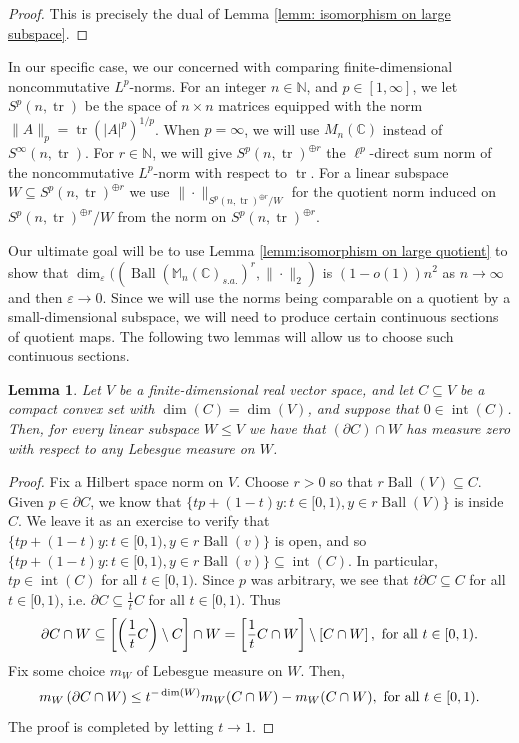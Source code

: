 \documentclass[10pt]{amsart}
\newtheorem{lem}[thm]{Lemma}
\theoremstyle{definition}
\numberwithin{equation}{section}
\newcommand{\bC}{{\mathbb C}}
\newcommand{\bM}{{\mathbb M}}
\newcommand{\bN}{{\mathbb N}}
\DeclareMathOperator{\tr}{tr}
\DeclareMathOperator{\Int}{int}
\DeclareMathOperator{\Ball}{Ball}
\begin{document}
\begin{proof}
This is precisely the dual of Lemma \ref{lemm: isomorphism on large subspace}.
\end{proof}

In our specific case, we our concerned with comparing finite-dimensional noncommutative $L^{p}$-norms. For an integer $n\in \bN$, and $p\in [1,\infty]$, we let $S^{p}(n,\tr)$ be the space of $n\times n$ matrices equipped with the norm $\|A\|_{p}=\tr(|A|^{p})^{1/p}$. When $p=\infty$, we will use $M_{n}(\bC)$ instead of $S^{\infty}(n,\tr)$.
For $r\in \bN$, we will give $S^{p}(n,\tr)^{\oplus r}$ the $\ell^{p}$-direct sum norm of the noncommutative $L^{p}$-norm with respect to $\tr$.
For a linear subspace $W\subseteq S^{p}(n,\tr)^{\oplus r}$ we use $\|\cdot\|_{S^{p}(n,\tr)^{\oplus r}/W}$ for the quotient norm induced on $S^{p}(n,\tr)^{\oplus r}/W$ from the norm on $S^{p}(n,\tr)^{\oplus r}$.

Our ultimate goal will be to use Lemma \ref{lemm:isomorphism on large quotient} to show that $\dim_{\varepsilon}((\Ball(\bM_{n}(\bC)_{s.a.})^{r},\|\cdot\|_{2})$ is $(1-o(1))n^{2}$ as $n\to\infty$ and then $\varepsilon\to 0$.  Since we will use the norms being comparable on a quotient by a small-dimensional subspace, we will need to produce certain continuous sections of quotient maps. The following two lemmas will allow us to choose such continuous sections. 



\begin{lem}\label{lemm:convex sets have small boundary}
Let $V$ be a finite-dimensional real vector space, and let $C\subseteq V$ be a compact convex set with $\dim(C)=\dim(V)$, and suppose that $0\in \Int(C)$. Then, for every linear subspace $W\leq V$ we have that $(\partial C)\cap W$ has measure zero with respect to any Lebesgue measure on $W$.

\end{lem}

\begin{proof}
Fix a Hilbert space norm  on $V$.
Choose $r>0$ so that $r\Ball(V)\subseteq C$. Given $p\in \partial C$, we know that $\{tp+(1-t)y:t\in [0,1),y\in r\Ball(V)\}$ is inside $C$. We leave it as an exercise to verify that $\{tp+(1-t)y:t\in [0,1),y\in r\Ball(v)\}$ is open, and so $\{tp+(1-t)y:t\in [0,1),y\in r\Ball(v)\}\subseteq \Int(C)$. In particular, $tp\in \Int(C)$ for all $t\in [0,1)$. Since $p$ was arbitrary, we see that $t\partial C\subseteq  C$ for all $t\in [0,1)$, i.e. $\partial C\subseteq \frac{1}{t}C$ for all $t\in [0,1)$. Thus 
\[\partial C\cap W\subseteq \left[\left(\frac{1}{t}C\right)\setminus C\right]\cap W=\left[\frac{1}{t} C\cap W\right]\setminus \left[C\cap W\right], \textnormal{ for all $t\in [0,1)$.}\]
Fix some choice $m_{W}$ of Lebesgue measure on $W$. Then,
\[m_{W}\left(\partial C\cap W\right)\leq t^{-\dim(W)}m_{W}( C\cap W)-m_{W}(C\cap W),\textnormal{ for all $t\in [0,1)$.}\]
The proof is completed by letting $t\to 1$. 
\end{proof}
\end{document}

